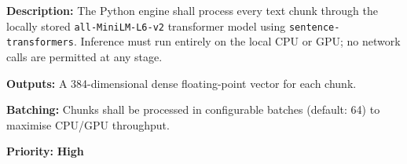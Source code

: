 \documentclass[12pt, a4paper]{article}
\begin{document}
\begin{tcolorbox}[enhanced, colback=white, colframe=ctPurple,
    colbacktitle=ctLightPurple, coltitle=ctPurple, boxrule=0.5pt,
    leftrule=4pt, arc=2mm, fonttitle=\large\bfseries,
    title={FR-3: Local Neural Embedding},
    drop fuzzy shadow=black!5!white, top=2pt, bottom=2pt]
\begin{prolist}
    \item \textbf{Description:} The Python engine shall process every text
    chunk through the locally stored \texttt{all-MiniLM-L6-v2} transformer
    model using \texttt{sentence-transformers}. Inference must run entirely
    on the local CPU or GPU; no network calls are permitted at any stage.

    \item \textbf{Outputs:} A 384-dimensional dense floating-point vector
    for each chunk.

    \item \textbf{Batching:} Chunks shall be processed in configurable
    batches (default: 64) to maximise CPU/GPU throughput.

    \item \textbf{Priority:} \textcolor{alertRed}{\textbf{High}}
\end{prolist}
\end{tcolorbox}

\vspace{0.4cm}
\end{document}
